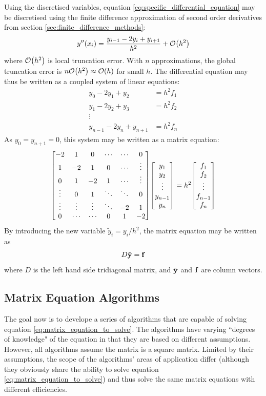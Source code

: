 \documentclass[reprint,english]{revtex4-1}
\begin{document}
Using the discretised variables, equation \eqref{eq:specific_differential_equation} may be discretised using the finite difference approximation of second order derivatives from section \ref{sec:finite_difference_methods}:
\begin{equation}
y''(x_i)=\frac{y_{i-1}-2y_i+y_{i+1}}{h^2}+\order{h^2}
\end{equation}
where \(\order{h^2}\) is local truncation error. With \(n\) approximations, the global truncation error is \(n\order{h^2}\approx\order{h}\) for small \(h\). The differential equation may thus be written as a coupled system of linear equations:
\begin{align*}
y_0-2y_1+y_2&=h^2f_1\\
y_1-2y_2+y_3&=h^2f_2\\
\vdots&\\
y_{n-1}-2y_n+y_{n+1}&=h^2f_n
\end{align*}
As \(y_0=y_{n+1}=0\), this system may be written as a matrix equation:
\[\mqty[-2 & 1 & 0 & \cdots & \cdots & 0 \\
1 & -2 & 1 & 0 & \cdots & \vdots \\
0 & 1 & -2 & 1 & \cdots & \vdots \\
\vdots & 0 & 1 & \ddots & \ddots & 0 \\
\vdots & \vdots & \vdots & \ddots & -2 & 1 \\
0 & \cdots & \cdots & 0 & 1 & -2]\mqty[y_1\\y_2\\\vdots\\y_{n-1}\\y_n]
=h^2\mqty[f_1\\f_2\\\vdots\\f_{n-1}\\f_n]\]
By introducing the new variable \(\tilde{y}_i=y_i/h^2\), the matrix equation may be written as
\begin{equation}\label{eq:matrix_equation_to_solve}
D\tilde{\vb{y}}=\vb{f}
\end{equation}
where \(D\) is the left hand side tridiagonal matrix, and \(\tilde{\vb{y}}\) and \(\vb{f}\) are column vectors.
\newpage
\subsection{Matrix Equation Algorithms}
The goal now is to develope a series of algorithms that are capable of solving equation \eqref{eq:matrix_equation_to_solve}. The algorithms have varying ``degrees of knowledge" of the equation in that they are based on different assumptions. However, all algorithms assume the matrix is a square matrix. Limited by their assumptions, the scope of the algorithms' areas of application differ (although they obviously share the ability to solve equation \eqref{eq:matrix_equation_to_solve}) and thus solve the same matrix equations with different efficiencies.
\end{document}
